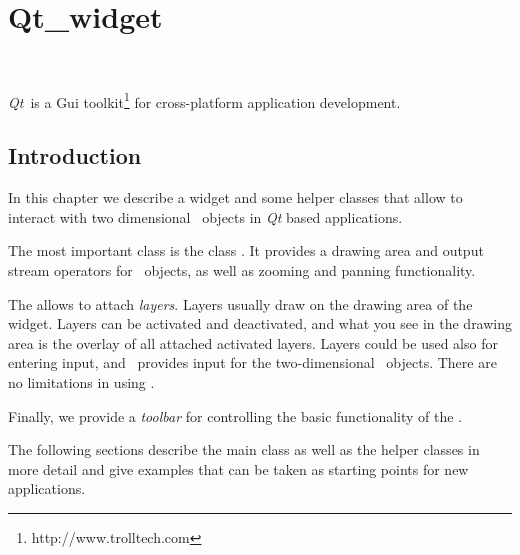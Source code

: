 
\newcommand{\qt}{{\em Qt}}      %

\gdef\lciIfHtmlClassLinks{\lcFalse}
\gdef\lciIfHtmlRefLinks{\lcFalse}
\gdef\lciIfHtmlLinks{\lcFalse}

\chapter{Qt\_widget}
\label{chapterQtwidget}

\\

\qt\ is a {\sc Gui} toolkit\footnote{http://www.trolltech.com} for
cross-platform application development. 

\section{Introduction}

In this chapter we describe a widget and some helper classes that
allow to interact with two dimensional \cgal\ objects in \qt\/ based applications.

The most important class is the class . It provides
a drawing area and output stream operators for \cgal\ objects, as well
as zooming and panning functionality.

The  allows to attach {\em layers}. Layers usually
draw on the drawing area of the widget. Layers can be activated and
deactivated, and what you see in the drawing area is the overlay of
all attached activated layers. Layers could be used also for entering
input, and \cgal\ provides input  for the two-dimensional
\cgal\ objects. There are no limitations in using .

Finally, we provide a {\em toolbar} for controlling the basic functionality
of the .

The following sections describe the main class as well as the helper classes
in more detail and give examples that can be taken as starting points for
new applications.



